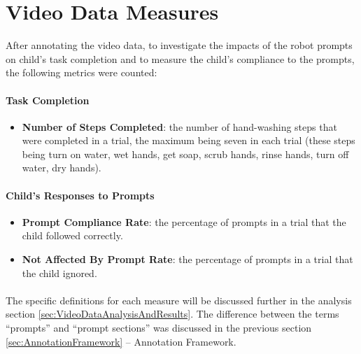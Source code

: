 \section{Video Data Measures}
\label{sec:measures}
After annotating the video data, to investigate the impacts of the robot prompts on child's task completion and to measure the child's compliance to the prompts, the following metrics were counted:

\paragraph{Task Completion}
\begin{itemize}
	\item \textbf{Number of Steps Completed}: the number of hand-washing steps that were completed in a trial, the maximum being seven in each trial (these steps being turn on water, wet hands, get soap, scrub hands, rinse hands, turn off water, dry hands).
\end{itemize}

\paragraph{Child's Responses to Prompts}
\begin{itemize}
	\item \textbf{Prompt Compliance Rate}: the percentage of prompts in a trial that the child followed correctly.
	\item \textbf{Not Affected By Prompt Rate}: the percentage of prompts in a trial that the child ignored.
\end{itemize}


\paragraph{} %
The specific definitions for each measure will be discussed further in the analysis section \ref{sec:VideoDataAnalysisAndResults}.  The difference between the terms ``prompts'' and ``prompt sections'' was discussed in the previous section \ref{sec:AnnotationFramework} -- Annotation Framework.